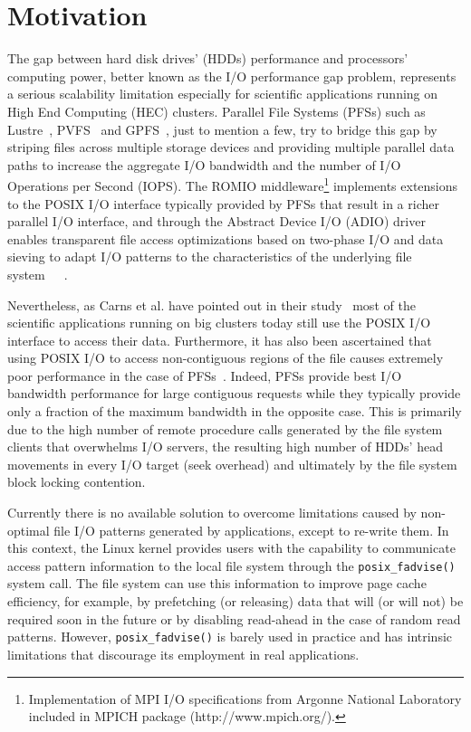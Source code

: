 \section{Motivation}
\label{sec: motivation}

The gap between hard disk drives' (HDDs) performance and processors' computing power, better known as the I/O performance gap problem, represents a serious scalability limitation especially for scientific applications running on High End Computing (HEC) clusters. Parallel File Systems (PFSs) such as Lustre~\cite{Braam02}, PVFS~\cite{CarnsLRT} and GPFS~\cite{SchmuckH02}, just to mention a few, try to bridge this gap by striping files across multiple storage devices and providing multiple parallel data paths to increase the aggregate I/O bandwidth and the number of I/O Operations per Second (IOPS). The ROMIO middleware\footnote{Implementation of MPI I/O specifications from Argonne National Laboratory included in MPICH package (http://www.mpich.org/).} implements extensions to the POSIX I/O interface typically provided by PFSs that result in a richer parallel I/O interface, and through the Abstract Device I/O (ADIO) driver~\cite{ThakurGL96} enables transparent file access optimizations based on two-phase I/O and data sieving to adapt I/O patterns to the characteristics of the underlying file system~\cite{ThakurGL99}~\cite{Ying08}~\cite{ProstTHKW00}.

Nevertheless, as Carns et al. have pointed out in their study~\cite{CarnsHABLLR11} most of the scientific applications running on big clusters today still use the POSIX I/O interface to access their data. Furthermore, it has also been ascertained that using POSIX I/O to access non-contiguous regions of the file causes extremely poor performance in the case of PFSs~\cite{ChingCLP06}. Indeed, PFSs provide best I/O bandwidth performance for large contiguous requests while they typically provide only a fraction of the maximum bandwidth in the opposite case. This is primarily due to the high number of remote procedure calls generated by the file system clients that overwhelms I/O servers, the resulting high number of HDDs' head movements in every I/O target (seek overhead) and ultimately by the file system block locking contention.

Currently there is no available solution to overcome limitations caused by non-optimal file I/O patterns generated by applications, except to re-write them. In this context, the Linux kernel provides users with the capability to communicate access pattern information to the local file system through the \texttt{posix\_fadvise()}~\cite{AdviseAPI} system call. The file system can use this information to improve page cache efficiency, for example, by prefetching (or releasing) data that will (or will not) be required soon in the future or by disabling read-ahead in the case of random read patterns. However, \texttt{posix\_fadvise()} is barely used in practice and has intrinsic limitations that discourage its employment in real applications.

